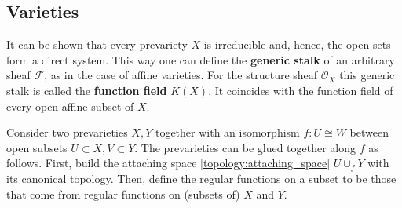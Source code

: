 \subsection{Varieties}


    \begin{remark}
        It can be shown that every prevariety $X$ is irreducible and, hence, the open sets form a direct system. This way one can define the \textbf{generic stalk} of an arbitrary sheaf $\mathcal{F}$, as in the case of affine varieties. For the structure sheaf $\mathcal{O}_X$ this generic stalk is called the \textbf{function field} $K(X)$. It coincides with the function field of every open affine subset of $X$.
    \end{remark}

    \begin{construct}[Gluing]\label{alggeom:gluing}
        Consider two prevarieties $X,Y$ together with an isomorphism $f:U\cong W$ between open subsets $U\subset X,V\subset Y$. The prevarieties can be glued together along $f$ as follows. First, build the attaching space \ref{topology:attaching_space} $U\cup_fY$ with its canonical topology. Then, define the regular functions on a subset to be those that come from regular functions on (subsets of) $X$ and $Y$.
    \end{construct}

